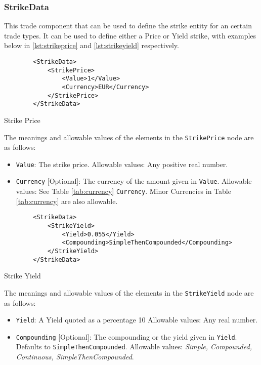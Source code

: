 \subsubsection{StrikeData}
\label{ss:strikedata}

This trade component that can be used to define the strike entity for an certain trade types. It can be used to define either a Price or Yield strike, with examples below in  \ref{lst:strikeprice} and \ref{lst:strikeyield} respectively.

\begin{listing}[H]
\begin{verbatim}
        <StrikeData>
			<StrikePrice>
				<Value>1</Value>
				<Currency>EUR</Currency>
			</StrikePrice>
		</StrikeData>
\end{verbatim}
\caption{Strike Price}
\label{lst:strikeprice}
\end{listing}

The meanings and allowable values of the elements in the \lstinline!StrikePrice! node are as follows:

\begin{itemize}

\item \lstinline!Value!: The strike price.
Allowable values: Any positive real number.

\item \lstinline!Currency! [Optional]: The currency of the amount given in \lstinline!Value!.
Allowable values: See Table \ref{tab:currency} \lstinline!Currency!. Minor Currencies in Table \ref{tab:currency} are also allowable.

\end{itemize}

\begin{listing}[H]
\begin{verbatim}
        <StrikeData>
			<StrikeYield>
				<Yield>0.055</Yield>
				<Compounding>SimpleThenCompounded</Compounding>
			</StrikeYield>
		</StrikeData>
\end{verbatim}
\caption{Strike Yield}
\label{lst:strikeyield}
\end{listing}

The meanings and allowable values of the elements in the \lstinline!StrikeYield! node are as follows:

\begin{itemize}

\item \lstinline!Yield!: A Yield quoted as a percentage 10%
Allowable values: Any real number.

\item \lstinline!Compounding! [Optional]: The compounding or the yield given in  \lstinline!Yield!. Defaults to \lstinline!SimpleThenCompounded!.
Allowable values: {\em Simple, Compounded, Continuous, SimpleThenCompounded}.

\end{itemize}
